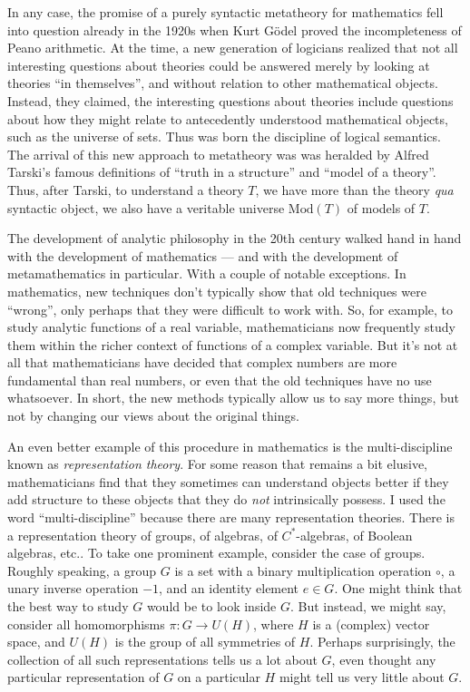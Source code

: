 In any case, the promise of a purely syntactic metatheory for
mathematics fell into question already in the 1920s when Kurt
G{\"o}del proved the incompleteness of Peano arithmetic.  At the time,
a new generation of logicians realized that not all interesting
questions about theories could be answered merely by looking at
theories ``in themselves'', and without relation to other mathematical
objects.  Instead, they claimed, the interesting questions about
theories include questions about how they might relate to antecedently
understood mathematical objects, such as the universe of sets.  Thus
was born the discipline of logical semantics.  The arrival of this new
approach to metatheory was was heralded by Alfred Tarski's famous
definitions of ``truth in a structure'' and ``model of a theory''.
Thus, after Tarski, to understand a theory $T$, we have more than the
theory {\it qua} syntactic object, we also have a veritable universe
$\mathrm{Mod}(T)$ of models of $T$.

The development of analytic philosophy in the 20th century walked hand
in hand with the development of mathematics --- and with the
development of metamathematics in particular.  With a couple of
notable exceptions.  In mathematics, new techniques don't typically
show that old techniques were ``wrong'', only perhaps that they were
difficult to work with.  So, for example, to study analytic functions
of a real variable, mathematicians now frequently study them within
the richer context of functions of a complex variable.  But it's not
at all that mathematicians have decided that complex numbers are more
fundamental than real numbers, or even that the old techniques have no
use whatsoever.  In short, the new methods typically allow us to say
more things, but not by changing our views about the original things.

An even better example of this procedure in mathematics is the
multi-discipline known as {\it representation theory}.  For some
reason that remains a bit elusive, mathematicians find that they
sometimes can understand objects better if they add structure to these
objects that they do {\it not} intrinsically possess.  I used the word
``multi-discipline'' because there are many representation theories.
There is a representation theory of groups, of algebras, of
$C^*$-algebras, of Boolean algebras, etc..  To take one prominent
example, consider the case of groups.  Roughly speaking, a group $G$
is a set with a binary multiplication operation $\circ$, a unary
inverse operation $-1$, and an identity element $e\in G$.  One might
think that the best way to study $G$ would be to look inside $G$.  But
instead, we might say, consider all homomorphisms $\pi :G\to U(H)$,
where $H$ is a (complex) vector space, and $U(H)$ is the group of all
symmetries of $H$.  Perhaps surprisingly, the collection of all such
representations tells us a lot about $G$, even thought any particular
representation of $G$ on a particular $H$ might tell us very little
about $G$.

